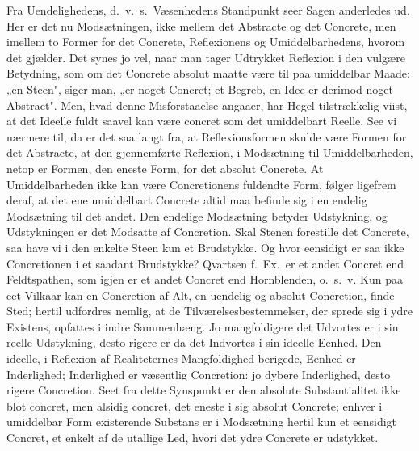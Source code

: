 \documentclass[12pt]{book}
\newcommand{\opage}[1]{\marginnote{\footnotesize\textit{[#1]}}}
\begin{document}
\opage{116} Fra Uendelighedens, d.\ v.\ s.\ Væsenhedens Standpunkt seer Sagen anderledes ud. Her er
det nu Modsætningen, ikke mellem det Abstracte og det Concrete, men imellem to Former for
det Concrete, Reflexionens og Umiddelbarhedens, hvorom det gjælder. Det synes jo vel,
naar man tager Udtrykket Reflexion i den vulgære Betydning, som om det Concrete absolut
maatte være til paa umiddelbar Maade: „en Steen", siger man, „er noget Concret; et
Begreb, en Idee er derimod noget Abstract". Men, hvad denne Misforstaaelse angaaer, har
Hegel tilstrækkelig viist, at det Ideelle fuldt saavel kan være concret som det
umiddelbart Reelle. See vi nærmere til, da er det saa langt fra, at Reflexionsformen
skulde være Formen for det Abstracte, at den gjennemførte Reflexion, i Modsætning til
Umiddelbarheden, netop er Formen, den eneste Form, for det absolut Concrete. At
Umiddelbarheden ikke kan være Concretionens fuldendte Form, følger ligefrem deraf, at det
ene umiddelbart Concrete altid maa befinde sig i en endelig Modsætning til det andet. Den
endelige Modsætning betyder Udstykning, og Udstykningen er det Modsatte af Concretion.
Skal Stenen forestille det Concrete, saa have vi i den enkelte Steen kun et Brudstykke.
Og hvor eensidigt er saa ikke Concretionen i et saadant Brudstykke? Qvartsen f.\ Ex.\ er
et andet Concret end Feldtspathen, som igjen er et andet Concret end Hornblenden, o.\
s.\ v. Kun paa eet Vilkaar kan en Concretion af Alt, en uendelig og absolut Concretion,
finde Sted; hertil udfordres nemlig, at de Tilværelsesbestemmelser, der sprede sig i ydre
Existens, opfattes i indre Sammenhæng. Jo mangfoldigere det Udvortes er i sin reelle
Udstykning, desto rigere er da det Indvortes i sin ideelle Eenhed. Den ideelle, i
Reflexion af Realiteternes Mangfoldighed berigede, Eenhed er Inderlighed; Inderlighed er
væsentlig Concretion: jo dybere Inderlighed, desto rigere Concretion. Seet fra dette
Synspunkt er den absolute Substantialitet ikke blot concret, men alsidig concret, det
\opage{117} eneste i sig absolut Concrete; enhver i umiddelbar Form existerende Substans er i
Modsætning hertil kun et eensidigt Concret, et enkelt af de utallige Led, hvori det ydre
Concrete er udstykket.
\end{document}

